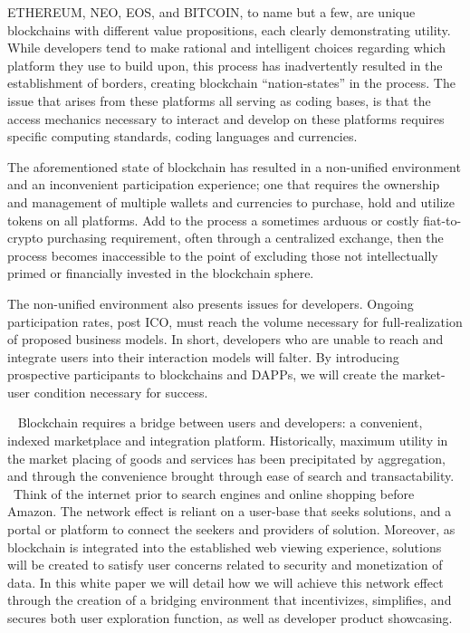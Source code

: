 \documentclass[]{article}
\begin{document}
{}

{ETHEREUM, NEO, EOS, and BITCOIN, to name but a few, are unique
blockchains with different value propositions, each clearly
demonstrating utility. While developers tend to make rational and
intelligent choices regarding which platform they use to build upon,
this process has inadvertently resulted in the establishment of borders,
creating blockchain ``nation-states'' in the process. The issue that
arises from these platforms all serving as coding bases, is that the
access mechanics necessary to interact and develop on these platforms
requires specific computing standards, coding languages and currencies.
}

{}

{The aforementioned state of blockchain has resulted in a non-unified
environment and an inconvenient participation experience; one that
requires the ownership and management of multiple wallets and currencies
to purchase, hold and utilize tokens on all platforms. Add to the
process a sometimes arduous or costly fiat-to-crypto purchasing
requirement, often through a centralized exchange, then the process
becomes inaccessible to the point of excluding those not intellectually
primed or financially invested in the blockchain sphere.}

{}

{The non-unified environment also presents issues for developers.
Ongoing participation rates, post ICO, must reach the volume necessary
for full-realization of proposed business models. In short, developers
who are unable to reach and integrate users into their interaction
models will falter. By introducing prospective participants to
blockchains and DAPPs, we will create the market-user condition
necessary for success. }

{}

{~ Blockchain requires a bridge between users and developers: a
convenient, indexed marketplace and integration platform. Historically,
maximum utility in the market placing of goods and services has been
precipitated by aggregation, and through the convenience brought through
ease of search and transactability. ~Think of the internet prior to
search engines and online shopping before Amazon. The network effect is
reliant on a user-base that seeks solutions, and a portal or platform to
connect the seekers and providers of solution. Moreover, as blockchain
is integrated into the established web viewing experience, solutions
will be created to satisfy user concerns related to security and
monetization of data. In this white paper we will detail how we will
achieve this network effect through the creation of a bridging
environment that incentivizes, simplifies, and secures both user
exploration function, as well as developer product showcasing.}
\end{document}
